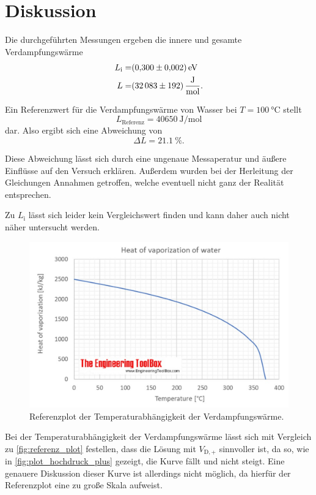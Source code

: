 \section{Diskussion}
\label{sec:Diskussion}


Die durchgeführten Messungen ergeben die innere und gesamte Verdampfungswärme
\begin{align*}
    L_\text{i} =& \SI{0.300+-0.002}{\electronvolt} \\
    L =& \SI{32083+-192}{\joule\per\mol}.
\end{align*}

Ein Referenzwert für die Verdampfungswärme von Wasser bei $T = \SI{100}{\celsius}$ stellt
\begin{equation*}
    L_\text{Referenz} = \SI{40650}{\joule\per\mol}
\end{equation*}
dar. \cite{Verdampfungswaerme}
Also ergibt sich eine Abweichung von
\begin{equation}
    \Delta L = \SI{21.1}{\percent}.
\end{equation}

Diese Abweichung lässt sich durch eine ungenaue Messaperatur und äußere Einflüsse auf den Versuch erklären. 
Außerdem wurden bei der Herleitung der Gleichungen Annahmen getroffen, welche eventuell nicht ganz der Realität entsprechen.

Zu $L_\text{i}$ lässt sich leider kein Vergleichswert finden und kann daher auch nicht näher untersucht werden.

\begin{figure}
    \centering
    \includegraphics[width=\textwidth]{images/referenz.png}
    \caption{Referenzplot der Temperaturabhängigkeit der Verdampfungswärme. \cite{Verdampfungswaerme}}
    \label{fig:referenz_plot}
\end{figure}

Bei der Temperaturabhängigkeit der Verdampfungswärme lässt sich mit Vergleich zu \autoref{fig:referenz_plot} festellen, dass die Lösung mit $V_{\text{D},+}$ sinnvoller ist, da so, wie in \autoref{fig:plot_hochdruck_plus} gezeigt, die Kurve fällt und nicht steigt.
Eine genauere Diskussion dieser Kurve ist allerdings nicht möglich, da hierfür der Referenzplot eine zu große Skala aufweist.
